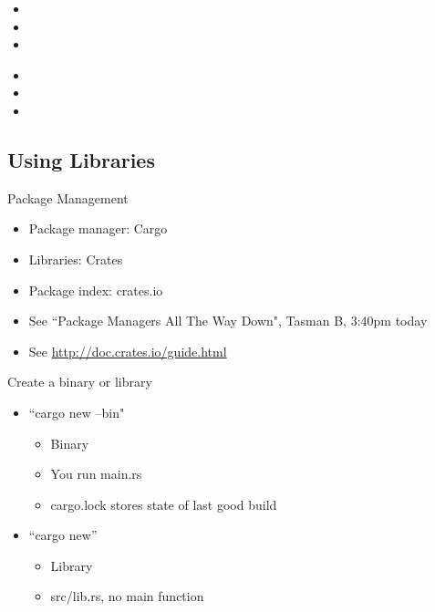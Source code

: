\documentclass[50pt]{beamer}
\begin{document}
\begin{frame}
    \begin{itemize}
        \item
        \item
        \item
    \end{itemize}
\end{frame}


\begin{frame}
    \begin{itemize}
        \item
        \item
        \item
    \end{itemize}
\end{frame}

\subsection{Using Libraries}

\begin{frame}
    Package Management
    \begin{itemize}
        \item Package manager: Cargo
        \item Libraries: Crates
        \item Package index: crates.io
        \item See ``Package Managers All The Way Down", Tasman B, 3:40pm today
        \item See \url{http://doc.crates.io/guide.html}
    \end{itemize}
\end{frame}

\begin{frame}
    Create a binary or library
    \begin{itemize}
        \item ``cargo new --bin"
            \begin{itemize}
                \item Binary
                \item You run main.rs
                \item cargo.lock stores state of last good build
            \end{itemize}
        \item ``cargo new''
            \begin{itemize}
                \item Library
                \item src/lib.rs, no main function
            \end{itemize}
    \end{itemize}
\end{frame}
\end{document}
